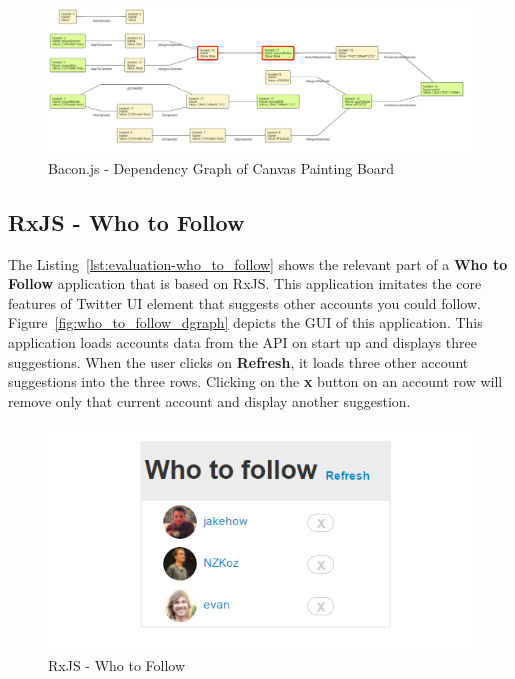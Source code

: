 \begin{figure}[!h]
	\centering
	\includegraphics[width=\textwidth,height=\textheight,keepaspectratio]{gfx/evaluation/dgraph_canvaspaint.png}
	\caption{Bacon.js - Dependency Graph of Canvas Painting Board}
	\label{fig:dgraph_canvaspaint}
\end{figure}

\subsection{RxJS - Who to Follow}

The Listing~\ref{lst:evaluation-who_to_follow} shows the relevant part of a \textbf{Who to Follow} application that is based on RxJS. This application imitates the core features of Twitter UI element that suggests other accounts you could follow. Figure~\ref{fig:who_to_follow_dgraph} depicts the GUI of this application. This application loads accounts data from the API on start up and displays three suggestions. When the user clicks on \textbf{Refresh}, it loads three other account suggestions into the three rows. Clicking on the \textbf{x} button on an account row will remove only that current account and display another suggestion. 


\begin{figure}[!h]
	\centering
	\includegraphics[width=\textwidth,height=\textheight,keepaspectratio]{gfx/evaluation/who_to_follow_ui.png}
	\caption{RxJS - Who to Follow}
	\label{fig:who_to_follow_ui}
\end{figure}

